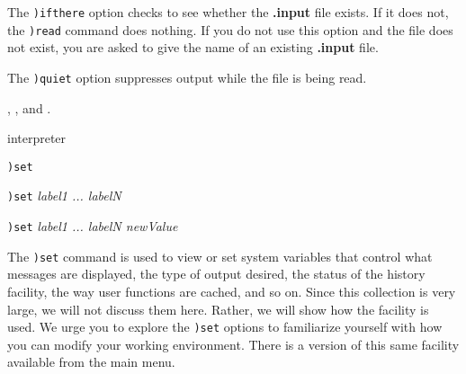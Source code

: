 {{{{{{{The {\tt )ifthere} option checks to see whether the {\bf .input} file
exists.
If it does not, the  {\tt )read} command does nothing.
If you do not use this option and the file does not exist,
you are asked to give the name of an existing {\bf .input} file.

The {\tt )quiet} option suppresses output while the file is being read.

\par{}
,
, and
.




\par{} interpreter

\par{}
\begin{simpleList}
\item {\tt )set}
\item {\tt )set} {\it label1 \lanb{}... labelN\ranb{}}
\item {\tt )set} {\it label1 \lanb{}... labelN\ranb{} newValue}
\end{simpleList}
\par{}

The {\tt )set} command is used to view or set system variables that
control what messages are displayed, the type of output desired, the
status of the history facility, the way \Language{} user functions are
cached, and so on.
Since this collection is very large, we will not discuss them here.
Rather, we will show how the facility is used.
We urge you to explore the {\tt )set} options to familiarize yourself
with how you can modify your \Language{} working environment.
There is a \HyperName{} version of this same facility available from the
main \HyperName{} menu.


}}}}}}}
